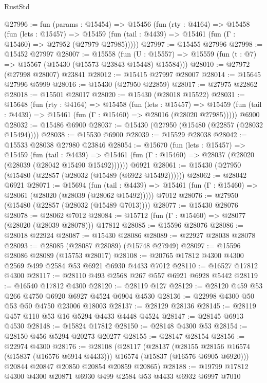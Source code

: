 \begin{lexlean}{RustStd}
\begin{coremodule}
{\begin{coremodule}
{{{{{{{{{{{{{{{{{{{{{{{{{{{{{{{{{{{{{{{{{{{{{{{{{{{{{{{{{{{{@27996 := fun (params : @15454) =>
  @15456
    (fun (rty : @4164) =>
    @15458
      (fun (lets : @15457) =>
      @15459 (fun (tail : @4439) => @15461 (fun (Γ : @15460) => @27952 (@27979 @27985)))))
@27997 := @15455 @27996
@27998 := @15452 @27997
@28007 := @15558
    (fun (U : @15557) => @15559 (fun (t : @7) => @15567 (@15430 (@15573 @23843 @15448) @15584)))
@28010 := @27972 (@27998 @28007) @23841
@28012 := @15415 @27997 @28007
@28014 := @15645 @27996 @5999
@28016 := @15430 (@27950 @22859)
@28017 := @27975 @22862
@28018 := @15501 @28017
@28020 := @15430 (@28018 @15522)
@28031 := @15648
    (fun (rty : @4164) =>
    @15458
      (fun (lets : @15457) =>
      @15459 (fun (tail : @4439) => @15461 (fun (Γ : @15460) => @28016 (@28020 @27985)))))
    @6900
@28032 := @15486 @6900
@28037 := @15430 (@27950 (@15480 (@22857 (@28032 @15494))))
@28038 := @15530 @6900
@28039 := @15529 @28038
@28042 := @15533 @28038 @27980 @23846
@28054 := @15670
    (fun (lets : @15457) =>
    @15459
      (fun (tail : @4439) =>
      @15461 (fun (Γ : @15460) => @28037 (@28020 (@28039 (@28042 @15490 @15492))))))
    @6921
@28061 := @15430 (@27950 (@15480 (@22857 (@28032 (@15489 (@6922 @15492))))))
@28062 := @28042 @6921
@28071 := @15694
    (fun (tail : @4439) => @15461 (fun (Γ : @15460) => @28061 (@28020 (@28039 (@28062 @15492)))))
    @7012
@28076 := @27950 (@15480 (@22857 (@28032 (@15489 @7013))))
@28077 := @15430 @28076
@28078 := @28062 @7012
@28084 := @15712 (fun (Γ : @15460) => @28077 (@28020 (@28039 @28078))) @17812
@28085 := @15596 @28076
@28086 := @28018 @22924
@28087 := @15430 @28086
@28089 := @22927 @28038 @28078
@28093 := @28085 (@28087 @28089) (@15748 @27949)
@28097 := @15596 @28086 @28089 (@15753 @28017)
@28108 := @20765 @17812 @4300 @4300 @2569 @499 @2584 @53 @6921 @6930 @4433 @7012
@28110 := @16527 @17812 @4300
@28117 := @28110 @493 @2568 @267 @557 @6921 @6928 @5442
@28119 := @16540 @17812 @4300
@28120 := @28119 @127
@28129 := @28120 @459 @53 @266 @4750 @6920 @6927 @4524 @6904 @4530
@28136 := @22998 @4300 @50 @53 @50 @4750 @23006 @18003
@28137 := @28129 @28136
@28145 := @28119 @457 @110 @53 @16 @5294 @4433 @4448 @4524
@28147 := @28145 @6913 @4530
@28148 := @15824 @17812
@28150 := @28148 @4300 @53
@28154 := @28150 @456 @5294 @20273 @20277
@28155 := @28147 @28154
@28156 := @22974 @4300
@28176 := @28108
    (@28117
      (@28137
        (@28155 @28156 @16574 (@15837 (@16576 @6914 @4433)))
        @16574
        (@15837 (@16576 @6905 @6920)))
      @20844
      @20847
      @20850
      @20854
      @20859
      @20865)
@28188 := @19799 @17812 @4300 @4300 @20871 @6930 @499 @2584 @53 @4433 @6932 @6997 @7010
}}}}}}}}}}}}}}}}}}}}}}}}}}}}}}}}}}}}}}}}}}}}}}}}}}}}}}}}}}}}
\end{coremodule}}
\end{coremodule}
\end{lexlean}
